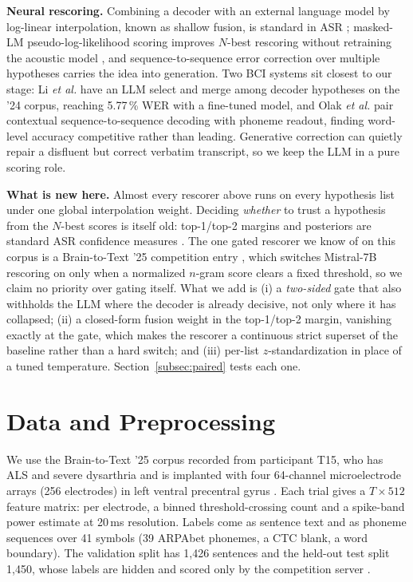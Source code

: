 \documentclass[conference,a4paper,10pt]{IEEEtran}
\newcommand{\pct}{\,\%}
\begin{document}
\textbf{Neural rescoring.} Combining a decoder with an external language model
by log-linear interpolation, known as shallow fusion, is standard in ASR
\cite{kannan2018shallow}; masked-LM pseudo-log-likelihood scoring improves
$N$-best rescoring without retraining the acoustic model
\cite{salazar2020mlmscoring}, and sequence-to-sequence error correction over
multiple hypotheses \cite{ma2023nbestt5,chen2023hyporadise} carries the idea into generation. Two
BCI systems sit closest to our stage: Li \textit{et al.} \cite{li2025dcond} have
an LLM select and merge among decoder hypotheses on the '24 corpus, reaching
5.77\pct{} WER with a fine-tuned model, and Olak \textit{et al.}
\cite{olak2026decoding} pair contextual sequence-to-sequence decoding with
phoneme readout, finding word-level accuracy competitive rather than leading.
Generative correction can quietly repair a disfluent but correct verbatim
transcript, so we keep the LLM in a pure scoring role.

\textbf{What is new here.} Almost every rescorer above runs on every hypothesis
list under one global interpolation weight. Deciding \emph{whether} to trust a
hypothesis from the $N$-best scores is itself old: top-1/top-2 margins and
posteriors are standard ASR confidence measures \cite{jiang2005confidence}. The
one gated rescorer we know of on this corpus is a Brain-to-Text '25 competition
entry \cite{cheng2026kaggle7}, which switches Mistral-7B rescoring on only when
a normalized $n$-gram score clears a fixed threshold, so we claim no priority
over gating itself. What we add is (i) a \emph{two-sided} gate that also
withholds the LLM where the decoder is already decisive, not only where it has
collapsed; (ii) a closed-form fusion weight in the top-1/top-2 margin, vanishing
exactly at the gate, which makes the rescorer a continuous strict superset of the
baseline rather than a hard switch; and (iii) per-list $z$-standardization in
place of a tuned temperature. Section~\ref{subsec:paired} tests each one.

\section{Data and Preprocessing}\label{sec:data}
We use the Brain-to-Text '25 corpus recorded from participant T15, who has ALS
and severe dysarthria and is implanted with four 64-channel microelectrode arrays
(256 electrodes) in left ventral precentral gyrus \cite{card2024accurate}. Each
trial gives a $T\times512$ feature matrix: per electrode, a binned
threshold-crossing count and a spike-band power estimate at 20\,ms resolution.
Labels come as sentence text and as phoneme sequences over 41 symbols (39 ARPAbet
phonemes, a CTC blank, a word boundary). The validation split has 1{,}426
sentences and the held-out test split 1{,}450, whose labels are hidden and
scored only by the competition server \cite{kaggle2025b2t}.
\end{document}
